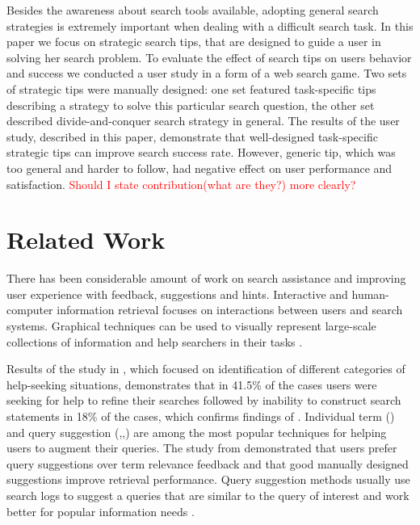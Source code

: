 \documentclass{sig-alternate}
\newcommand\todo[1]{\textcolor{red}{#1}}
\begin{document}
Besides the awareness about search tools available, adopting general search strategies is extremely important when dealing with a difficult search task.
In this paper we focus on strategic search tips, that are designed to guide a user in solving her search problem.
To evaluate the effect of search tips on users behavior and success we conducted a user study in a form of a web search game.
Two sets of strategic tips were manually designed: one set featured task-specific tips describing a strategy to solve this particular search question, the other set described divide-and-conquer search strategy in general.
The results of the user study, described in this paper, demonstrate that well-designed task-specific strategic tips can improve search success rate.
However, generic tip, which was too general and harder to follow, had negative effect on user performance and satisfaction.
\todo{Should I state contribution(what are they?) more clearly?}

\section{Related Work}

There has been considerable amount of work on search assistance and improving user experience with feedback, suggestions and hints.
Interactive and human-computer information retrieval \cite{marchionini2006toward} focuses on interactions between users and search systems.
Graphical techniques can be used to visually represent large-scale collections of information and help searchers in their tasks \cite{card1999readings}.

Results of the study in \cite{xie2009understanding}, which focused on identification of different categories of help-seeking situations, demonstrates that in 41.5\% of the cases users were seeking for help to refine their searches followed by inability to construct search statements in 18\% of the cases, which confirms findings of \cite{Holscher2000337}.
Individual term (\cite{ruthven2003survey}) and query suggestion (\cite{Jones:2006:GQS:1135777.1135835},\cite{Bhatia:2011:QSA:2009916.2010023},\cite{Cao:2008:CQS:1401890.1401995}) are among the most popular techniques for helping users to augment their queries.
The study from \cite{Kelly:2009:CQT:1571941.1572006} demonstrated that users prefer query suggestions over term relevance feedback and that good manually designed suggestions improve retrieval performance.
Query suggestion methods usually use search logs to suggest a queries that are similar to the query of interest and work better for popular information needs \cite{Bhatia:2011:QSA:2009916.2010023}.
\end{document}
